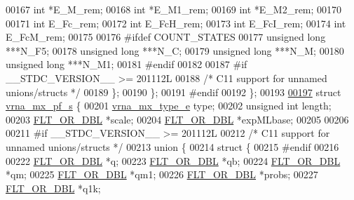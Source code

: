 \begin{DoxyCode}
00167       \textcolor{keywordtype}{int}             *E\_M\_rem;
00168       \textcolor{keywordtype}{int}             *E\_M1\_rem;
00169       \textcolor{keywordtype}{int}             *E\_M2\_rem;
00170 
00171       \textcolor{keywordtype}{int}             E\_Fc\_rem;
00172       \textcolor{keywordtype}{int}             E\_FcH\_rem;
00173       \textcolor{keywordtype}{int}             E\_FcI\_rem;
00174       \textcolor{keywordtype}{int}             E\_FcM\_rem;
00175 
00176 \textcolor{preprocessor}{#ifdef COUNT\_STATES}
00177       \textcolor{keywordtype}{unsigned} \textcolor{keywordtype}{long}   ***N\_F5;
00178       \textcolor{keywordtype}{unsigned} \textcolor{keywordtype}{long}   ***N\_C;
00179       \textcolor{keywordtype}{unsigned} \textcolor{keywordtype}{long}   ***N\_M;
00180       \textcolor{keywordtype}{unsigned} \textcolor{keywordtype}{long}   ***N\_M1;
00181 \textcolor{preprocessor}{#endif}
00182 
00187 \textcolor{preprocessor}{#if \_\_STDC\_VERSION\_\_ >= 201112L}
00188     \textcolor{comment}{/* C11 support for unnamed unions/structs */}
00189     \};
00190   \};
00191 \textcolor{preprocessor}{#endif}
00192 \};
00193 
\hypertarget{dp__matrices_8h_source_l00197}{}\hyperlink{group__dp__matrices}{00197} \textcolor{keyword}{struct }\hyperlink{group__dp__matrices_structvrna__mx__pf__s}{vrna\_mx\_pf\_s} \{
00201   \hyperlink{group__dp__matrices_ga6042ea1d58d01931e959791be6d89343}{vrna\_mx\_type\_e}  type;
00202   \textcolor{keywordtype}{unsigned} \textcolor{keywordtype}{int}    length;
00203   \hyperlink{group__data__structures_ga31125aeace516926bf7f251f759b6126}{FLT\_OR\_DBL}      *scale;
00204   \hyperlink{group__data__structures_ga31125aeace516926bf7f251f759b6126}{FLT\_OR\_DBL}      *expMLbase;
00205 
00206 
00211 \textcolor{preprocessor}{#if \_\_STDC\_VERSION\_\_ >= 201112L}
00212     \textcolor{comment}{/* C11 support for unnamed unions/structs */}
00213   \textcolor{keyword}{union }\{
00214     \textcolor{keyword}{struct }\{
00215 \textcolor{preprocessor}{#endif}
00216 
00222       \hyperlink{group__data__structures_ga31125aeace516926bf7f251f759b6126}{FLT\_OR\_DBL}  *q;
00223       \hyperlink{group__data__structures_ga31125aeace516926bf7f251f759b6126}{FLT\_OR\_DBL}  *qb;
00224       \hyperlink{group__data__structures_ga31125aeace516926bf7f251f759b6126}{FLT\_OR\_DBL}  *qm;
00225       \hyperlink{group__data__structures_ga31125aeace516926bf7f251f759b6126}{FLT\_OR\_DBL}  *qm1;
00226       \hyperlink{group__data__structures_ga31125aeace516926bf7f251f759b6126}{FLT\_OR\_DBL}  *probs;
00227       \hyperlink{group__data__structures_ga31125aeace516926bf7f251f759b6126}{FLT\_OR\_DBL}  *q1k;

\end{DoxyCode}
